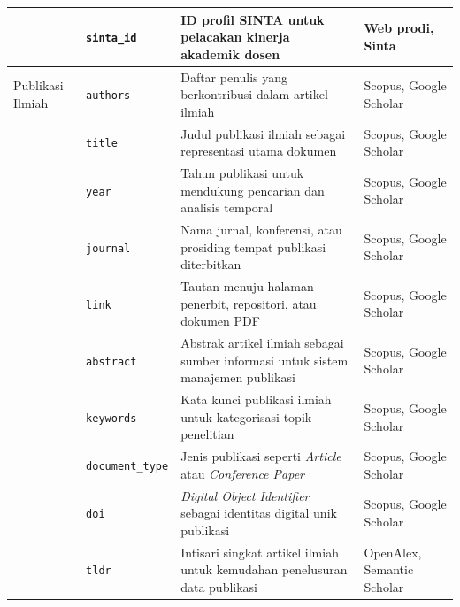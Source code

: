 \documentclass{rapidsart}
\theoremstyle{plain}
\theoremstyle{remark}
\theoremstyle{definition}
\begin{document}
\begin{sloppypar}
\begin{longtable}{ll>{\raggedright\arraybackslash}p{}>{\raggedright\arraybackslash}p{}}
                               & \texttt{sinta\_id}      & ID profil SINTA untuk pelacakan kinerja akademik dosen                           & Web prodi, Sinta           \\
        \midrule
        Publikasi Ilmiah       & \texttt{authors}        & Daftar penulis yang berkontribusi dalam artikel ilmiah                           & Scopus, Google Scholar     \\
                               & \texttt{title}          & Judul publikasi ilmiah sebagai representasi utama dokumen                        & Scopus, Google Scholar     \\
                               & \texttt{year}           & Tahun publikasi untuk mendukung pencarian dan analisis temporal                  & Scopus, Google Scholar     \\
                               & \texttt{journal}        & Nama jurnal, konferensi, atau prosiding tempat publikasi diterbitkan             & Scopus, Google Scholar     \\
                               & \texttt{link}           & Tautan menuju halaman penerbit, repositori, atau dokumen PDF                     & Scopus, Google Scholar     \\
                               & \texttt{abstract}       & Abstrak artikel ilmiah sebagai sumber informasi untuk sistem manajemen publikasi & Scopus, Google Scholar     \\
                               & \texttt{keywords}       & Kata kunci publikasi ilmiah untuk kategorisasi topik penelitian                  & Scopus, Google Scholar     \\
                               & \texttt{document\_type} & Jenis publikasi seperti \textit{Article} atau \textit{Conference Paper}          & Scopus, Google Scholar     \\
                               & \texttt{doi}            & \textit{Digital Object Identifier} sebagai identitas digital unik publikasi      & Scopus, Google Scholar     \\
                               & \texttt{tldr}           & Intisari singkat artikel ilmiah untuk kemudahan penelusuran data publikasi       & OpenAlex, Semantic Scholar \\
    \end{longtable}
    \endgroup


\end{sloppypar}
\end{document}
